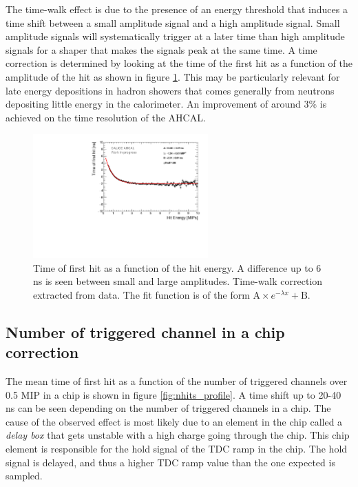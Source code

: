 \documentclass{JINST}
\begin{document}
The time-walk effect is due to the presence of an energy threshold that induces a time shift between a small amplitude signal and a high amplitude signal. Small amplitude signals will systematically trigger at a later time than high amplitude signals for a shaper that makes the signals peak at the same time. A time correction is determined by looking at the time of the first hit as a function of the amplitude of the hit as shown in figure \ref{fig:time_walk}. This may be particularly relevant for late energy depositions in hadron showers that comes generally from neutrons depositing little energy in the calorimeter. An improvement of around 3\% is achieved on the time resolution of the AHCAL.

\begin{figure}[htbp!]
	\centering
	\includegraphics[width=0.6\textwidth]{fig/TimeWalkProfile.pdf}
	\caption{Time of first hit as a function of the hit energy. A difference up to 6 ns is seen between small and large amplitudes. Time-walk correction extracted from data. The fit function is of the form $\text{A} \times e^{-\lambda{}x} + \text{B}$.}\label{fig:time_walk}
\end{figure}

\subsection{Number of triggered channel in a chip correction}
\label{sec:NumberTrigger}

The mean time of first hit as a function of the number of triggered channels over 0.5 MIP in a chip is shown in figure \ref{fig:nhits_profile}. A time shift up to 20-40 ns can be seen depending on the number of triggered channels in a chip. The cause of the observed effect is most likely due to an element in the chip called a \textit{delay box} that gets unstable with a high charge going through the chip. This chip element is responsible for the hold signal of the TDC ramp in the chip. The hold signal is delayed, and thus a higher TDC ramp value than the one expected is sampled.
\end{document}
